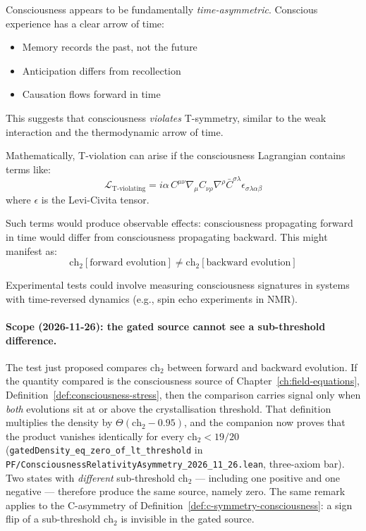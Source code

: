 \begin{level3}
Consciousness appears to be fundamentally \textit{time-asymmetric}. Conscious experience has a clear arrow of time:
\begin{itemize}
\item Memory records the past, not the future
\item Anticipation differs from recollection
\item Causation flows forward in time
\end{itemize}

This suggests that consciousness \textit{violates} T-symmetry, similar to the weak interaction and the thermodynamic arrow of time.

Mathematically, T-violation can arise if the consciousness Lagrangian contains terms like:
\begin{equation}
\mathcal{L}_{\text{T-violating}} = i \alpha \, C^{\mu\nu} \nabla_\mu C_{\nu\rho} \nabla^\rho \bar{C}^{\sigma\lambda} \epsilon_{\sigma\lambda\alpha\beta}
\end{equation}
where $\epsilon$ is the Levi-Civita tensor.

Such terms would produce observable effects: consciousness propagating forward in time would differ from consciousness propagating backward. This might manifest as:
\begin{equation}
\text{ch}_2[\text{forward evolution}] \neq \text{ch}_2[\text{backward evolution}]
\end{equation}

Experimental tests could involve measuring consciousness signatures in systems with time-reversed dynamics (e.g., spin echo experiments in NMR).

\paragraph{Scope (2026-11-26): the gated source cannot see a sub-threshold
difference.}
The test just proposed compares $\text{ch}_2$ between forward and backward
evolution. If the quantity compared is the consciousness source of
Chapter~\ref{ch:field-equations},
Definition~\ref{def:consciousness-stress}, then the comparison carries signal
only when \emph{both} evolutions sit at or above the crystallisation threshold.
That definition multiplies the density by $\Theta(\text{ch}_2 - 0.95)$, and the
companion now proves that the product vanishes identically for every
$\text{ch}_2 < 19/20$
(\texttt{gatedDensity\_eq\_zero\_of\_lt\_threshold} in
\texttt{PF/ConsciousnessRelativityAsymmetry\_2026\_11\_26.lean}, three-axiom
bar). Two states with \emph{different} sub-threshold $\text{ch}_2$ --- including
one positive and one negative --- therefore produce the same source, namely
zero. The same remark applies to the C-asymmetry of
Definition~\ref{def:c-symmetry-consciousness}: a sign flip of a sub-threshold
$\text{ch}_2$ is invisible in the gated source.


\end{level3}
